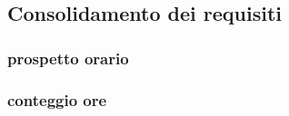 \subsection{Consolidamento dei requisiti}
	\subsubsection{prospetto orario}
	\subsubsection{conteggio ore}
